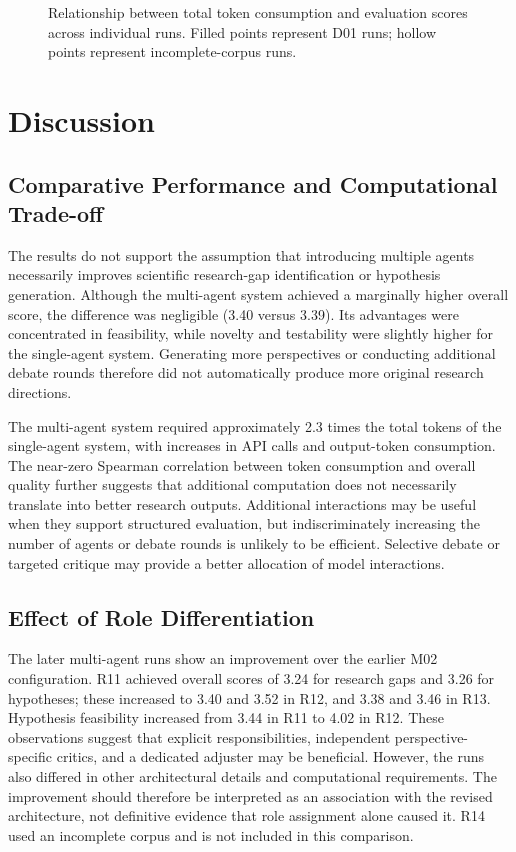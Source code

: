 \documentclass[sigconf,review,anonymous=false]{acmart}
\begin{document}
\begin{figure}[t]
\centering
{}
\caption{Relationship between total token consumption and evaluation scores across individual runs. Filled points represent D01 runs; hollow points represent incomplete-corpus runs.}
\label{fig:tokens-quality}
\end{figure}

\section{Discussion}
\subsection{Comparative Performance and Computational Trade-off}
The results do not support the assumption that introducing multiple agents necessarily improves scientific research-gap identification or hypothesis generation. Although the multi-agent system achieved a marginally higher overall score, the difference was negligible (3.40 versus 3.39). Its advantages were concentrated in feasibility, while novelty and testability were slightly higher for the single-agent system. Generating more perspectives or conducting additional debate rounds therefore did not automatically produce more original research directions.

The multi-agent system required approximately 2.3 times the total tokens of the single-agent system, with increases in API calls and output-token consumption. The near-zero Spearman correlation between token consumption and overall quality further suggests that additional computation does not necessarily translate into better research outputs. Additional interactions may be useful when they support structured evaluation, but indiscriminately increasing the number of agents or debate rounds is unlikely to be efficient. Selective debate or targeted critique may provide a better allocation of model interactions.

\subsection{Effect of Role Differentiation}
The later multi-agent runs show an improvement over the earlier M02 configuration. R11 achieved overall scores of 3.24 for research gaps and 3.26 for hypotheses; these increased to 3.40 and 3.52 in R12, and 3.38 and 3.46 in R13. Hypothesis feasibility increased from 3.44 in R11 to 4.02 in R12. These observations suggest that explicit responsibilities, independent perspective-specific critics, and a dedicated adjuster may be beneficial. However, the runs also differed in other architectural details and computational requirements. The improvement should therefore be interpreted as an association with the revised architecture, not definitive evidence that role assignment alone caused it. R14 used an incomplete corpus and is not included in this comparison.
\end{document}
